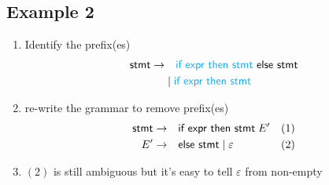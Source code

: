\documentclass[10pt,a4paper,landscape]{article}
\begin{document}
\begin{multicols*}{3}
\section*{Example 2}
\begin{enumerate}
\item Identify the  prefix(es)
  \begin{align*}
    \textsf{stmt} \to &\quad \textsf{\mb{if expr then stmt} else stmt} \\
                      &\gor \mb{\textsf{if expr then stmt}}
  \end{align*}
\item re-write the grammar to remove  prefix(es)
  \begin{align*}
    \textsf{stmt} \to &\quad \textsf{if expr then stmt}\; E' &(1) \\
     E'\to &\quad \textsf{else stmt} \;|\; \varepsilon        &(2)
  \end{align*}
\item $(2)$ is still ambiguous but it's easy to tell $\varepsilon$ from non-empty
\end{enumerate}
\end{multicols*}
\end{document}
